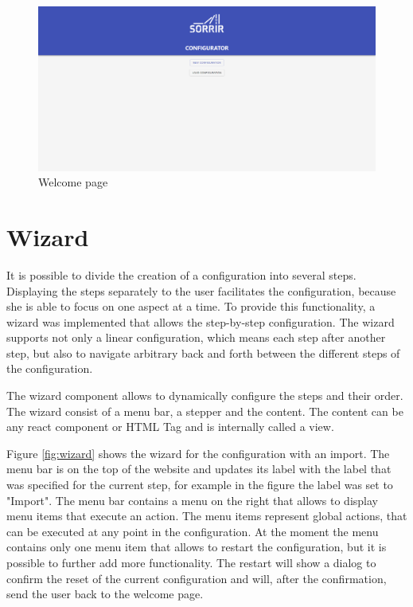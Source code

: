\begin{figure}[ht]
    \centering
    \includegraphics[width=\textwidth]{img/app_welcome.png}
    \caption{Welcome page}
    \label{fig:app_welcome}
\end{figure}

\section{Wizard}
\label{sec:wizard}
It is possible to divide the creation of a configuration into several steps. Displaying the steps separately to the user facilitates the configuration, because she is able to focus on one aspect at a time. To provide this functionality, a wizard was implemented that allows the step-by-step configuration. The wizard supports not only a linear configuration, which means each step after another step, but also to navigate arbitrary back and forth between the different steps of the configuration. 

The wizard component allows to dynamically configure the steps and their order. The wizard consist of a menu bar, a stepper and the content. The content can be any react component or HTML Tag and is internally called a view. 

Figure \ref{fig:wizard} shows the wizard for the configuration with an import. The menu bar is on the top of the website and updates its label with the label that was specified for the current step, for example in the figure the label was set to "Import". The menu bar contains a menu on the right that allows to display menu items that execute an action. The menu items represent global actions, that can be executed at any point in the configuration. At the moment the menu contains only one menu item that allows to restart the configuration, but it is possible to further add more functionality. The restart will show a dialog to confirm the reset of the current configuration and will, after the confirmation, send the user back to the welcome page.

